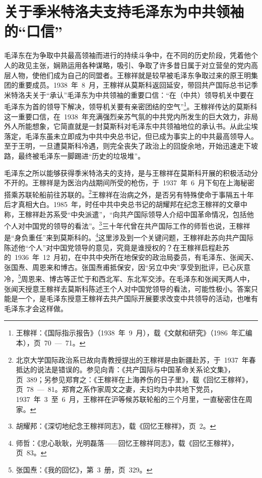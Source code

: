 \section{关于季米特洛夫支持毛泽东为中共领袖的“口信”}

毛泽东在为争取中共最高领袖而进行的持续斗争中，在不同的历史阶段，凭着他个人的政见主张，娴熟运用各种谋略，吸引、争取了许多昔日属于对立营垒的党内高层人物，使他们成为自己的同盟者。王稼祥就是较早被毛泽东争取过来的原王明集团的重要成员。1938~年~8~月，王稼祥从莫斯科返回延安，带回共产国际总书记季米特洛夫关于“承认”毛泽东为中共领袖的重要口信：“在（中共）领导机关中要在毛泽东为首的领导下解决，领导机关要有亲密团结的空气”\footnote{王稼祥：《国际指示报告》（1938~年~9~月），载《文献和研究》（1986~年汇编本），页~70~—~71。}。王稼祥传达的莫斯科这一重要口信，在~1938~年充满强烈亲苏气氛的中共党内所发生的巨大效力，非局外人所能想象，它简直就是一封莫斯科对毛泽东中共领袖地位的承认书。从此尘埃落定，毛泽东虽未立即成为中共中央总书记，但已成为事实上的中共最高领导人。至于王明，一旦遭莫斯科冷遇，则完全丧失了政治上的回旋余地，开始迅速走下坡路，最终被毛泽东一脚踢进“历史的垃圾堆”。

毛泽东之所以能够获得季米特洛夫的支持，是与王稼祥在莫斯科开展的积极活动分不开的。王稼祥是为医治内战期间所受的枪伤，于~1937~年~6~月下旬在上海秘密搭乘苏联轮船前往苏联的。\footnote{北京大学国际政治系已故向青教授提出的王稼祥是由新疆赴苏，于~1937~年春抵达的说法是错误的。参见向青：《共产国际与中国革命关系论文集》，页~389；另参见郑育之：《王稼祥在上海养伤的日子里》，载《回忆王稼祥》，页~78~—~81。郑育之系作家周文之妻，夫妇均为中共地下党员，1937~年~3~至~6~月，王稼祥在沪等候苏联轮船的三个月里，一直秘密住在周家。}王稼祥在治病之外，是否另有特殊使命于事隔五十年后才真相大白。1985~年，时任中共中央总书记的胡耀邦在纪念王稼祥的文章中称，王稼祥赴苏系受“中央派遣”，“向共产国际领导人介绍中国革命情况，包括他个人对中国党的领导的看法”。\footnote{胡耀邦：《深切地纪念王稼祥同志》，载《回忆王稼祥》，页~2。}三十年代曾在共产国际工作的师哲也说，王稼祥是“身负重任”来到莫斯科的。\footnote{师哲：《忠心耿耿，光明磊落——回忆王稼祥同志》，载《回忆王稼祥》，页~83。}这里涉及到一个关键问题，王稼祥赴苏向共产国际陈述他“个人”对中国党领导的意见，究竟是谁授权的？在王稼祥启程赴苏的~1936~年~12~月初，在中共中央所在地保安的政治局委员，有毛泽东、张闻天、张国焘、周恩来和博古。张国焘甫抵保安，因“另立中央”享受到批评，已心灰意冷，\footnote{张国焘：《我的回忆》，第~3~册，页~329。}周恩来、博古等正忙于和西北军、东北军交涉。在毛泽东和张闻天两人中，张闻天授意王稼祥去莫斯科陈述王个人对中国党领导的看法，可能性极小。答案只能是一个，是毛泽东授意王稼祥去共产国际开展要求改变中共领导的活动，也唯有毛泽东才会这样做。

